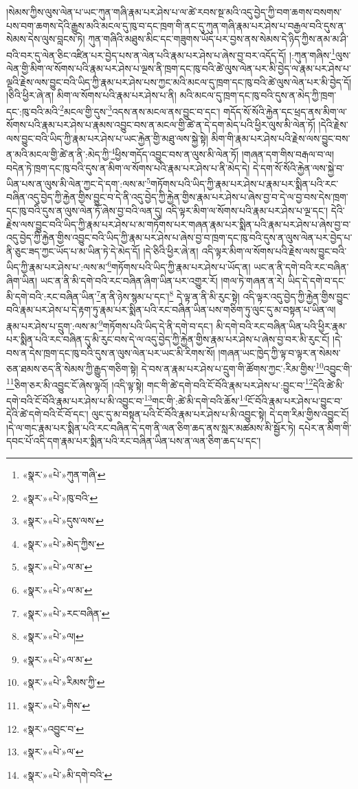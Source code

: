 །སེམས་ཀྱིས་ལུས་ལེན་པ་ཡང་ཀུན་གཞི་རྣམ་པར་ཤེས་པ་ལ་ཚེ་རབས་སྔ་མའི་འདུ་བྱེད་ཀྱི་བག་ཆགས་བསགས་པས་བག་ཆགས་དེའི་རྒྱུས་མའི་མངལ་དུ་ཁུ་བ་དང་ཁྲག་གི་ནང་དུ་ཀུན་གཞི་རྣམ་པར་ཤེས་པ་བརྒྱལ་བའི་དུས་ན་སེམས་དེས་ལུས་བླངས་ཏེ། ཀུན་གཞིའི་མཐུས་མིང་དང་གཟུགས་ཡོད་པར་བྱས་ནས་སེམས་དེ་ཉིད་ཀྱིས་ནམ་མ་ཤི་བའི་བར་དུ་ལེན་ཅིང་འཛིན་པར་བྱེད་པས་ན་ལེན་པའི་རྣམ་པར་ཤེས་པ་ཞེས་བྱ་བར་འདོད་དོ། །:ཀུན་གཞིས་\footnote{«སྣར་»«པེ་»ཀུན་གཞི་}ལུས་ལེན་གྱི་མིག་ལ་སོགས་པའི་རྣམ་པར་ཤེས་པ་ལྔས་ནི་ཁྲག་དང་ཁུ་བའི་ཚེ་ལུས་ལེན་པར་མི་བྱེད་ལ་རྣམ་པར་ཤེས་པ་ལྔའི་རྗེས་ལས་བྱུང་བའི་ཡིད་ཀྱི་རྣམ་པར་ཤེས་པས་ཀྱང་མའི་མངལ་དུ་ཁྲག་དང་ཁུ་བའི་ཚེ་ལུས་ལེན་པར་མི་བྱེད་དོ། །ཅིའི་ཕྱིར་ཞེ་ན། མིག་ལ་སོགས་པའི་རྣམ་པར་ཤེས་པ་ནི། མའི་མངལ་དུ་ཁྲག་དང་ཁུ་བའི་དུས་ན་མེད་ཀྱི་ཁྲག་དང་:ཁུ་བའི་མའི་\footnote{«སྣར་»«པེ་»ཁུ་བའི་}མངལ་གྱི་དུས་\footnote{«སྣར་»«པེ་»དུས་ལས་}འདས་ནས་མངལ་ནས་བྱུང་བ་དང་། གདོད་སོ་སོའི་རྐྱེན་དང་ཕྲད་ནས་མིག་ལ་སོགས་པའི་རྣམ་པར་ཤེས་པ་རྣམས་འབྱུང་བས་ན་མངལ་གྱི་ཚེ་ན་དེ་དག་མེད་པའི་ཕྱིར་ལུས་མི་ལེན་ཏོ། །དེའི་རྗེས་ལས་བྱུང་བའི་ཡིད་ཀྱི་རྣམ་པར་ཤེས་པ་ཡང་རྐྱེན་གྱི་མཐུ་ལས་སྐྱེ་སྟེ། མིག་གི་རྣམ་པར་ཤེས་པའི་རྗེས་ལས་བྱུང་བས་ན་མའི་མངལ་གྱི་ཚེ་ན་ནི་:མེད་ཀྱི་\footnote{«སྣར་»«པེ་»མེད་ཀྱིས་}ཕྱིས་གདོད་འབྱུང་བས་ན་ལུས་མི་ལེན་ཏོ། །གཞན་དག་གིས་བརྒལ་བ་ལ། བདེན་ཏེ་ཁྲག་དང་ཁུ་བའི་དུས་ན་མིག་ལ་སོགས་པའི་རྣམ་པར་ཤེས་པ་ནི་མེད་དེ། དེ་དག་སོ་སོའི་རྐྱེན་ལས་སྐྱེ་བ་ཡིན་པས་ན་ལུས་མི་ལེན་ཀྱང་དེ་དག་:ལས་མ་\footnote{«སྣར་»«པེ་»ལ་མ་}གཏོགས་པའི་ཡིད་ཀྱི་རྣམ་པར་ཤེས་པ་རྣམ་པར་སྨིན་པའི་རང་བཞིན་འདུ་བྱེད་ཀྱི་རྐྱེན་གྱིས་བྱུང་བ་དེ་ནི་འདུ་བྱེད་ཀྱི་རྐྱེན་གྱིས་རྣམ་པར་ཤེས་པ་ཞེས་བྱ་བ་དེ་ལ་བྱ་བས་དེས་ཁྲག་དང་ཁུ་བའི་དུས་ན་ལུས་ལེན་ཏོ་ཞེས་བྱ་བའི་ལན་དུ། འདི་ལྟར་མིག་ལ་སོགས་པའི་རྣམ་པར་ཤེས་པ་ལྔ་དང་། དེའི་རྗེས་ལས་བྱུང་བའི་ཡིད་ཀྱི་རྣམ་པར་ཤེས་པ་མ་གཏོགས་པར་གཞན་རྣམ་པར་སྨིན་པའི་རྣམ་པར་ཤེས་པ་ཞེས་བྱ་བ་འདུ་བྱེད་ཀྱི་རྐྱེན་གྱིས་འབྱུང་བའི་ཡིད་ཀྱི་རྣམ་པར་ཤེས་པ་ཞེས་བྱ་བ་ཁྲག་དང་ཁུ་བའི་དུས་ན་ལུས་ལེན་པར་བྱེད་པ་ནི་ཅུང་ཟད་ཀྱང་ཡོད་པ་མ་ཡིན་ཏེ་དེ་མེད་དོ། །དེ་ཅིའི་ཕྱིར་ཞེ་ན། འདི་ལྟར་མིག་ལ་སོགས་པའི་རྗེས་ལས་བྱུང་བའི་ཡིད་ཀྱི་རྣམ་པར་ཤེས་པ་:ལས་མ་\footnote{«སྣར་»«པེ་»ལ་མ་}གཏོགས་པའི་ཡིད་ཀྱི་རྣམ་པར་ཤེས་པ་ཡོད་ན། ཡང་ན་ནི་དགེ་བའི་རང་བཞིན་ཞིག་ཡིན། ཡང་ན་ནི་མི་དགེ་བའི་རང་བཞིན་ཞིག་ཡིན་པར་འགྱུར་རོ། །གལ་ཏེ་གཞན་ན་རེ། ཡིད་དེ་དགེ་བ་དང་མི་དགེ་བའི་:རང་བཞིན་ཡིན་\footnote{«སྣར་»«པེ་»རང་བཞིན་}ན་ནི་ཉེས་སྙམ་པ་དང་།\footnote{«སྣར་»«པེ་»ལ།} དེ་ལྟ་ན་ནི་མི་རུང་སྟེ། འདི་ལྟར་འདུ་བྱེད་ཀྱི་རྐྱེན་གྱིས་བྱུང་བའི་རྣམ་པར་ཤེས་པ་དེ་རྟག་ཏུ་རྣམ་པར་སྨིན་པའི་རང་བཞིན་ཡིན་པས་གཅིག་ཏུ་ལུང་དུ་མ་བསྟན་པ་ཡིན་ལ། རྣམ་པར་ཤེས་པ་དྲུག་:ལས་མ་\footnote{«སྣར་»«པེ་»ལ་མ་}གཏོགས་པའི་ཡིད་དེ་ནི་དགེ་བ་དང་། མི་དགེ་བའི་རང་བཞིན་ཡིན་པའི་ཕྱིར་རྣམ་པར་སྨིན་པའི་རང་བཞིན་དུ་མི་རུང་བས་དེ་ལ་འདུ་བྱེད་ཀྱི་རྐྱེན་གྱིས་རྣམ་པར་ཤེས་པ་ཞེས་བྱ་བར་མི་རུང་ངོ། །དེ་བས་ན་དེས་ཁྲག་དང་ཁུ་བའི་དུས་ན་ལུས་ལེན་པར་ཡང་མི་རིགས་སོ། །གཞན་ཡང་ཁྱེད་ཀྱི་ལྟ་བ་ལྟར་ན་སེམས་ཅན་ཐམས་ཅད་ནི་སེམས་ཀྱི་རྒྱུད་གཅིག་སྟེ། དེ་བས་ན་རྣམ་པར་ཤེས་པ་དྲུག་གི་ཚོགས་ཀྱང་:རིམ་གྱིས་\footnote{«སྣར་»«པེ་»རིམས་ཀྱི་}འབྱུང་གི་\footnote{«སྣར་»«པེ་»གིས་}ཅིག་ཅར་མི་འབྱུང་ངོ་ཞེས་ལྟའོ། །འདི་ལྟ་སྟེ། གང་གི་ཚེ་དགེ་བའི་ངོ་བོའི་རྣམ་པར་ཤེས་པ་:བྱུང་བ་\footnote{«སྣར་»འབྱུང་བ་}དེའི་ཚེ་མི་དགེ་བའི་ངོ་བོའི་རྣམ་པར་ཤེས་པ་མི་འབྱུང་བ་\footnote{«སྣར་»«པེ་»ལ་}གང་གི་:ཚེ་མི་དགེ་བའི་ཆོས་\footnote{«སྣར་»«པེ་»མི་དགེ་བའི་}ངོ་བོའི་རྣམ་པར་ཤེས་པ་བྱུང་བ་དེའི་ཚེ་དགེ་བའི་ངོ་བོ་དང་། ལུང་དུ་མ་བསྟན་པའི་ངོ་བོའི་རྣམ་པར་ཤེས་པ་མི་འབྱུང་སྟེ། དེ་དག་རིམ་གྱིས་འབྱུང་ངོ། །དེ་ལ་གང་རྣམ་པར་སྨིན་པའི་རང་བཞིན་དེ་དག་ནི་ལན་ཅིག་ཆད་ནས་སླར་མཚམས་མི་སྦྱོར་ཏེ། དཔེར་ན་མིག་གི་དབང་པོ་འདི་དག་རྣམ་པར་སྨིན་པའི་རང་བཞིན་ཡིན་པས་ན་ལན་ཅིག་ཆད་པ་དང་། 